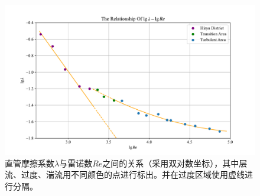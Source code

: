\documentclass[UTF8,AutoFakeBold,a4paper]{article}
\begin{document}
\begin{figure}[h]
	\centering
	\includegraphics[scale=0.6]{流体阻力1}
	\caption{直管摩擦系数$\lambda$与雷诺数$Re$之间的关系（采用双对数坐标），其中层流、过度、湍流用不同颜色的点进行标出。并在过度区域使用虚线进行分隔。}
\end{figure}


\newpage
\end{document}
